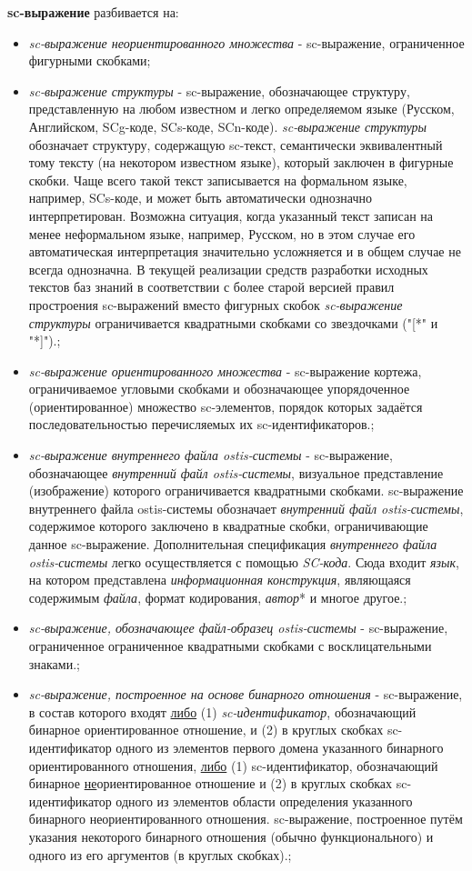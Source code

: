\textbf{sc-выражение} разбивается на:
\begin{itemize}
	\item{\textit{sc-выражение неориентированного множества} - sc-выражение, ограниченное фигурными скобками};
	\item{\textit{sc-выражение структуры} - sc-выражение, обозначающее структуру, представленную на любом известном и легко определяемом языке (Русском, Английском, SCg-коде, SCs-коде, SCn-коде).
	\textit{sc-выражение структуры} обозначает структуру, содержащую sc-текст, семантически эквивалентный тому тексту (на некотором известном языке), который заключен в фигурные скобки. Чаще всего такой текст записывается на формальном языке, например, SCs-коде, и может быть автоматически однозначно интерпретирован. Возможна ситуация, когда указанный текст записан на менее неформальном языке, например, Русском, но в этом случае его автоматическая интерпретация значительно усложняется и в общем случае не всегда однозначна.
	В текущей реализации средств разработки исходных текстов баз знаний в соответствии с более старой версией правил простроения sc-выражений вместо фигурных скобок \textit{sc-выражение структуры} ограничивается квадратными скобками со звездочками ("[*" и "*]").};
	\item{\textit{sc-выражение ориентированного множества} - sc-выражение кортежа, ограничиваемое угловыми скобками и обозначающее упорядоченное (ориентированное) множество sc-элементов, порядок которых задаётся последовательностью перечисляемых их sc-идентификаторов.};
	\item{\textit{sc-выражение внутреннего файла ostis-системы} - sc-выражение, обозначающее \textit{внутренний файл ostis-системы}, визуальное представление (изображение) которого ограничивается квадратными скобками. sc-выражение внутреннего файла ostis-системы обозначает \textit{внутренний файл ostis-системы}, содержимое которого заключено в квадратные скобки, ограничивающие данное sc-выражение.
	Дополнительная спецификация \textit{внутреннего файла ostis-системы} легко осуществляется с помощью \textit{SC-кода}. Сюда входит \textit{язык}, на котором представлена \textit{информационная конструкция}, являющаяся содержимым \textit{файла}, формат кодирования, \textit{автор}* и многое другое.};
	\item{\textit{sc-выражение, обозначающее файл-образец ostis-системы} - sc-выражение, ограниченное ограниченное квадратными скобками с восклицательными знаками.};
	\item{\textit{sc-выражение, построенное на основе бинарного отношения} - sc-выражение, в состав которого входят \uline{либо} (1) \textit{sc-идентификатор}, обозначающий бинарное ориентированное отношение, и (2) в круглых скобках sc-идентификатор одного из элементов первого домена указанного бинарного ориентированного отношения, \uline{либо} (1) sc-идентификатор, обозначающий бинарное \uline{не}ориентированное отношение и (2) в круглых скобках sc-идентификатор одного из элементов области определения указанного бинарного неориентированного отношения. sc-выражение, построенное путём указания некоторого бинарного отношения (обычно функционального) и одного из его аргументов (в круглых скобках).};

\end{itemize}
